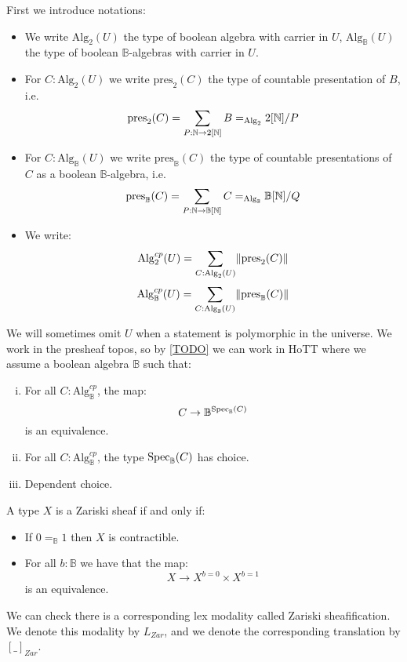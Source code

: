First we introduce notations:
\begin{itemize}
\item We write $\mathrm{Alg}_2(U)$ the type of boolean algebra with carrier in $U$, $\mathrm{Alg}_\mathbb{B}(U)$ the type of boolean $\mathbb{B}$-algebras with carrier in $U$.
\item For $C:\mathrm{Alg}_2(U)$ we write $\mathrm{pres}_{2}(C)$ the type of countable presentation of $B$, i.e.
\[\mathrm{pres}_{2}(C) = \sum_{P:\mathbb{N}\to 2[\mathbb{N}]} B =_{\mathrm{Alg}_2} 2[\mathbb{N}]/P\]
\item For $C:\mathrm{Alg}_\mathbb{B}(U)$ we write $\mathrm{pres}_\mathbb{B}(C)$ the type of countable presentations of $C$ as a boolean $\mathbb{B}$-algebra, i.e.
\[\mathrm{pres}_\mathbb{B}(C) = \sum_{P:\mathbb{N}\to \mathbb{B}[\mathbb{N}]} C =_{\mathrm{Alg}_\mathbb{B}} \mathbb{B}[\mathbb{N}]/Q\]
\item We write: 
\[\mathrm{Alg}^{cp}_2(U) = \sum_{C:\mathrm{Alg}_2(U)}\lVert \mathrm{pres}_2(C) \rVert \]
\[\mathrm{Alg}^{cp}_\mathbb{B}(U) = \sum_{C:\mathrm{Alg}_\mathbb{B}(U)}\lVert \mathrm{pres}_\mathbb{B}(C) \rVert\]
\end{itemize}

We will sometimes omit $U$ when a statement is polymorphic in the universe. We work in the presheaf topos, so by \cref{TODO} we can work in HoTT where we assume a boolean algebra $\mathbb{B}$ such that:

\begin{enumerate}[(i)]
\item For all $C:\mathrm{Alg}^{cp}_\mathbb{B}$, the map:
\[C \to \mathbb{B}^{\operatorname{Spec}_\mathbb{B}(C)}\]
is an equivalence.
\item For all $C:\mathrm{Alg}^{cp}_\mathbb{B}$, the type $\operatorname{Spec}_\mathbb{B}(C)$ has choice.
\item Dependent choice.
\end{enumerate}

\begin{definition}\label{zariski-characterisation}
A type $X$ is a Zariski sheaf if and only if:
\begin{itemize}
\item If $0=_\mathbb{B}1$ then $X$ is contractible.
\item For all $b:\mathbb{B}$ we have that the map:
\[X\to X^{b=0}\times X^{b=1}\]
is an equivalence.
\end{itemize}
\end{definition}

We can check there is a corresponding lex modality called Zariski sheafification. We denote this modality by $L_{Zar}$, and we denote the corresponding translation by $[\_]_{Zar}$.

